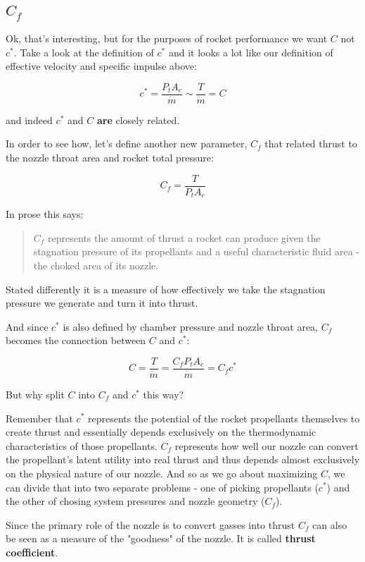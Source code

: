 \documentclass[11pt]{article}
\begin{document}
    \subsection{\texorpdfstring{\(C_f\)}{C\_f}}\label{c_f}

Ok, that's interesting, but for the purposes of rocket performance we
want \(C\) not \(c^*\). Take a look at the definition of \(c^*\) and it
looks a lot like our definition of effective velocity and specific
impulse above:

\[c^* = \frac{P_t A_c}{\dot{m}} \sim \frac{T}{\dot{m}} = C\]

and indeed \(c^*\) and \(C\) \textbf{are} closely related.

In order to see how, let's define another new parameter, \(C_f\) that
related thrust to the nozzle throat area and rocket total pressure:

\[C_f = \frac{T}{P_t A_c}\]

In prose this says:

\begin{quote}
\(C_f\) represents the amount of thrust a rocket can produce given the
stagnation pressure of its propellants and a useful characteristic fluid
area - the choked area of its nozzle.
\end{quote}

Stated differently it is a measure of how effectively we take the
stagnation pressure we generate and turn it into thrust.

And since \(c^*\) is also defined by chamber pressure and nozzle throat
area, \(C_f\) becomes the connection between \(C\) and \(c^*\):

\[C = \frac{T}{\dot{m}} = \frac{C_f P_t A_c}{\dot{m}} = C_f c^*\]

But why split \(C\) into \(C_f\) and \(c^*\) this way?

Remember that \(c^*\) represents the potential of the rocket propellants
themselves to create thrust and essentially depends exclusively on the
thermodynamic characteristics of those propellants. \(C_f\) represents
how well our nozzle can convert the propellant's latent utility into
real thrust and thus depends almost exclusively on the physical nature
of our nozzle. And so as we go about maximizing \(C\), we can divide
that into two separate problems - one of picking propellants (\(c^*\))
and the other of chosing system pressures and nozzle geometry (\(C_f\)).

Since the primary role of the nozzle is to convert gasses into thrust
\(C_f\) can also be seen as a measure of the "goodness" of the nozzle.
It is called \textbf{thrust coefficient}.
\end{document}
